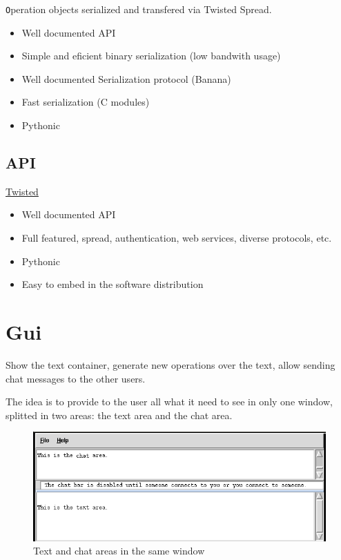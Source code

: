 \documentclass{article}
\begin{document}
{\texttt Operation} objects serialized and transfered via Twisted Spread.

\begin{itemize}
\item Well documented API
\item Simple and eficient binary serialization (low bandwith usage)
\item Well documented Serialization protocol (Banana)
\item Fast serialization (C modules)
\item Pythonic
\end{itemize}

\subsection{API}
  
\href{http://www.twistedmatrix.com}{Twisted}

\begin{itemize}
\item Well documented API
\item Full featured, spread, authentication, web services, diverse protocols, etc.
\item Pythonic
\item Easy to embed in the software distribution
\end{itemize}
\section{Gui}

Show the text container, generate new operations over the text, allow sending chat messages to the other users.

The idea is to provide to the user all what it need to see in only one window, splitted in two areas: the text area and the chat area.

\begin{figure}[htbp]
 \begin{center}
    \includegraphics[angle=0,width=0.5\linewidth]{schemas/text_and_chat_area.png}
 \end{center}
 \label{fig:textandchatarea}
 \caption{Text and chat areas in the same window}
\end{figure}
\end{document}
